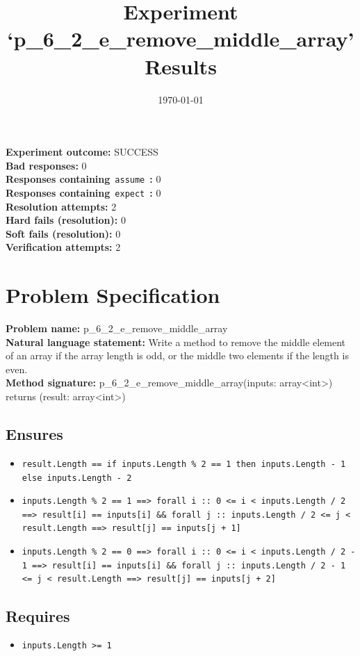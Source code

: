 \documentclass{article}
\begin{document}
\title{Experiment `p\_6\_2\_e\_remove\_middle\_array' Results}
\author{\today}
\date{}
\maketitle
\textbf{Experiment outcome: }SUCCESS
\\\textbf{Bad responses: }0
\\\textbf{Responses containing}~\texttt{assume}~\textbf{: }0
\\\textbf{Responses containing}~\texttt{expect}~\textbf{: }0
\\\textbf{Resolution attempts: }2
\\\textbf{Hard fails (resolution): }0
\\\textbf{Soft fails (resolution): }0
\\\textbf{Verification attempts: }2
\section*{Problem Specification}
\textbf{Problem name: }p\_6\_2\_e\_remove\_middle\_array
\\\textbf{Natural language statement: }Write a method to remove the middle element of an array if the array length is odd, or the middle two elements if the length is even.
\\\textbf{Method signature: }p\_6\_2\_e\_remove\_middle\_array(inputs: array<int>) returns (result: array<int>)
\subsection*{Ensures}
\begin{itemize}
\item \texttt{result.Length == if inputs.Length \% 2 == 1 then inputs.Length - 1 else inputs.Length - 2}
\item \texttt{inputs.Length \% 2 == 1 ==> forall i :: 0 <= i < inputs.Length / 2 ==> result[i] == inputs[i] \&\& forall j :: inputs.Length / 2 <= j < result.Length ==> result[j] == inputs[j + 1]}
\item \texttt{inputs.Length \% 2 == 0 ==> forall i :: 0 <= i < inputs.Length / 2 - 1 ==> result[i] == inputs[i] \&\& forall j :: inputs.Length / 2 - 1 <= j < result.Length ==> result[j] == inputs[j + 2]}
\end{itemize}
\subsection*{Requires}
\begin{itemize}
\item \texttt{inputs.Length >= 1}
\end{itemize}
\clearpage
\end{document}
